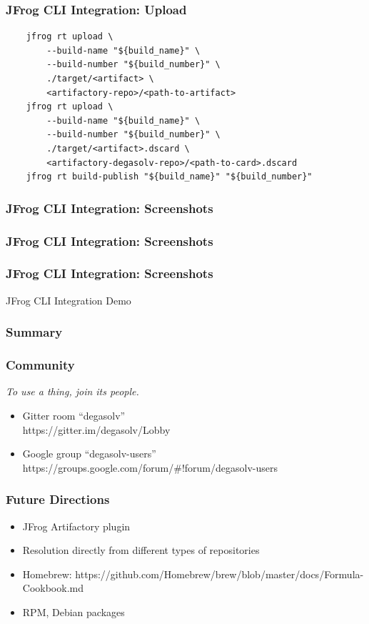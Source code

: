 \documentclass{beamer}
\begin{document}
\begin{frame}[fragile]
\frametitle{JFrog CLI Integration: Upload}
\begin{verbatim}
    jfrog rt upload \
        --build-name "${build_name}" \
        --build-number "${build_number}" \
        ./target/<artifact> \
        <artifactory-repo>/<path-to-artifact>
    jfrog rt upload \
        --build-name "${build_name}" \
        --build-number "${build_number}" \
        ./target/<artifact>.dscard \
        <artifactory-degasolv-repo>/<path-to-card>.dscard
    jfrog rt build-publish "${build_name}" "${build_number}"

\end{verbatim}
\end{frame}
\begin{frame}
\frametitle{JFrog CLI Integration: Screenshots}
\end{frame}
\begin{frame}
\frametitle{JFrog CLI Integration: Screenshots}
\end{frame}
\begin{frame}
\frametitle{JFrog CLI Integration: Screenshots}
\end{frame}
\begin{frame}
    \centerline{\color{blue}\Large JFrog CLI Integration Demo}
\end{frame}
\begin{frame}
  \frametitle{Summary}
\end{frame}
\begin{frame}
  \frametitle{Community}
  \textit{To use a thing, join its people.}
  
  \break

  \begin{itemize}
  \item Gitter room ``degasolv'' \\
    https://gitter.im/degasolv/Lobby
  \item Google group ``degasolv-users'' \\
    https://groups.google.com/forum/\#!forum/degasolv-users
  \end{itemize}
\end{frame}
\begin{frame}
  \frametitle{Future Directions}
  \begin{itemize}
  \item JFrog Artifactory plugin
  \item Resolution directly from different types of repositories
  \item Homebrew: https://github.com/Homebrew/brew/blob/master/docs/Formula-Cookbook.md
  \item RPM, Debian packages
  \end{itemize}
\end{frame}
\end{document}
